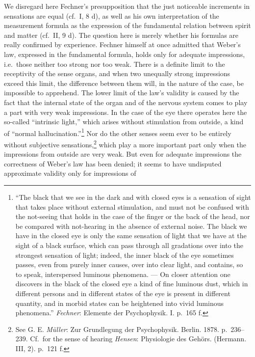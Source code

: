 \documentclass[12pt,a4paper]{book}
\newcommand{\opage}[1]{\marginnote{\footnotesize\textit{[#1]}}}
\begin{document}
We disregard here Fechner's presupposition that the just noticeable
increments in sensations are equal (cf.\ I, 8 d), as well as his own
interpretation of the measurement formula as the expression of the
fundamental relation between spirit and matter (cf.\ II, 9 d). The
question here is merely whether his formulas are really confirmed by
experience. Fechner himself at once admitted that Weber's law, expressed
in the fundamental formula, holds only for adequate impressions, i.e.\
those neither too strong nor too weak. There is a definite limit to the
receptivity of the sense organs, and when two unequally strong
impressions exceed this limit, the difference between them will, in the
nature of the case, be impossible to apprehend. The lower limit of the
law's validity is caused by the fact that the internal state of the
organ and of the nervous system comes to play a part with very weak
impressions. In the case of the eye there operates here the so-called
``intrinsic light,'' which arises without stimulation from outside, a
kind of ``normal hallucination.''\footnote{``The black that we see in
the dark and with closed eyes is a sensation of sight that takes place
without external stimulation, and must not be confused with the
not-seeing that holds in the case of the finger or the back of the head,
nor be compared with not-hearing in the absence of external noise. The
black we have in the closed eye is only the same sensation of light that
we have at the sight of a black surface, which can pass through all
gradations over into the strongest sensation of light; indeed, the inner
black of the eye sometimes passes, even from purely inner causes, over
into clear light, and contains, so to speak, interspersed luminous
phenomena. --- On closer attention one discovers in the black of the
closed eye a kind of fine luminous dust, which in different persons and
in different states of the eye is present in different quantity, and in
morbid states can be heightened into vivid luminous phenomena.''
\emph{Fechner}: Elemente der Psychophysik. I. p.~165 f.} Nor do the
other senses seem ever to
\opage{134}be entirely without subjective sensations,\footnote{See G. E.
\emph{Müller}: Zur Grundlegung der Psychophysik. Berlin. 1878.
p.~236--239. Cf.\ for the sense of hearing \emph{Hensen}: Physiologie
des Gehörs. (Hermann. III, 2). p.~121 f.} which play a more important
part only when the impressions from outside are very weak. But even for
adequate impressions the correctness of Weber's law has been denied; it
seems to have undisputed approximate validity only for impressions of
\end{document}
